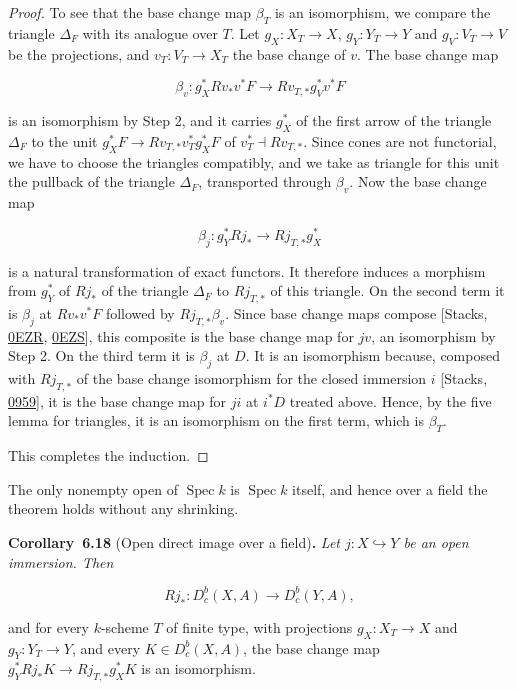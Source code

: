 \documentclass[11pt]{article}
\newenvironment{bpstatement}[2]{\par\addvspace{0.6\baselineskip}\noindent\textbf{#1}#2\textbf{.}\enspace\ignorespaces}
  {\par\addvspace{0.4\baselineskip}}
\newenvironment{bpstatementit}[2]{\begin{bpstatement}{#1}{#2}\itshape\ignorespaces}{\end{bpstatement}}
\providecommand{\Dbc}{}\renewcommand{\Dbc}{D^b_c}
\begin{document}
\begin{proof}[{Proof}]
To see that the base change map \(\beta_T\) is an isomorphism, we compare the triangle \(\Delta_F\) with its analogue over \(T\). Let \(g_X:X_T\to X\), \(g_Y:Y_T\to Y\) and \(g_V:V_T\to V\) be the projections, and \(v_T:V_T\to X_T\) the base change of \(v\). The base change map

\[
\beta_v:g_X^*Rv_*v^*F\longrightarrow Rv_{T,*}g_V^*v^*F
\]

is an isomorphism by Step 2, and it carries \(g_X^*\) of the first arrow of the triangle \(\Delta_F\) to the unit \(g_X^*F\to Rv_{T,*}v_T^*g_X^*F\) of \(v_T^*\dashv Rv_{T,*}\). Since cones are not functorial, we have to choose the triangles compatibly, and we take as triangle for this unit the pullback of the triangle \(\Delta_F\), transported through \(\beta_v\). Now the base change map

\[
\beta_j:g_Y^*Rj_*\longrightarrow Rj_{T,*}g_X^*
\]

is a natural transformation of exact functors. It therefore induces a morphism from \(g_Y^*\) of \(Rj_*\) of the triangle \(\Delta_F\) to \(Rj_{T,*}\) of this triangle. On the second term it is \(\beta_j\) at \(Rv_*v^*F\) followed by \(Rj_{T,*}\beta_v\). Since base change maps compose [Stacks, \href{https://stacks.math.columbia.edu/tag/0EZR}{0EZR}, \href{https://stacks.math.columbia.edu/tag/0EZS}{0EZS}], this composite is the base change map for \(jv\), an isomorphism by Step 2. On the third term it is \(\beta_j\) at \(D\). It is an isomorphism because, composed with \(Rj_{T,*}\) of the base change isomorphism for the closed immersion \(i\) [Stacks, \href{https://stacks.math.columbia.edu/tag/0959}{0959}], it is the base change map for \(ji\) at \(i^*D\) treated above. Hence, by the five lemma for triangles, it is an isomorphism on the first term, which is \(\beta_T\).

This completes the induction.
\end{proof}

\label{bp53}%
The only nonempty open of \(\operatorname{Spec}k\) is \(\operatorname{Spec}k\) itself, and hence over a field the theorem holds without any shrinking.

\label{bp54}%
\begin{bpstatementit}{Corollary~6.18}{ (Open direct image over a field)}
Let \(j:X\hookrightarrow Y\) be an open immersion. Then

\[
Rj_*:\Dbc(X,A)\longrightarrow\Dbc(Y,A),
\tag{6.22}
\]

and for every \(k\)-scheme \(T\) of finite type, with projections \(g_X:X_T\to X\) and \(g_Y:Y_T\to Y\), and every \(K\in\Dbc(X,A)\), the base change map \(g_Y^*Rj_*K\to Rj_{T,*}g_X^*K\) is an isomorphism.
\end{bpstatementit}
\end{document}
